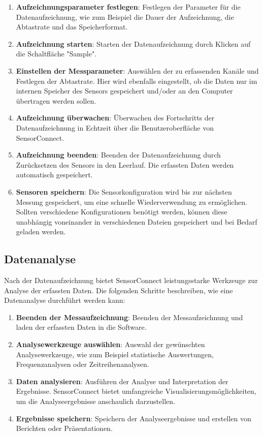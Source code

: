 \begin{enumerate}
    \item \textbf{Aufzeichnungsparameter festlegen}: Festlegen der Parameter für die Datenaufzeichnung, wie zum Beispiel die Dauer der Aufzeichnung, die Abtastrate und das Speicherformat.
    \item \textbf{Aufzeichnung starten}: Starten der Datenaufzeichnung durch Klicken auf die Schaltfläche "Sample".
    \item \textbf{Einstellen der Messparameter}: Auswählen der zu erfassenden Kanäle und Festlegen der Abtastrate. Hier wird ebenfalls eingestellt, ob die Daten nur im internen Speicher des Sensors gespeichert und/oder an den Computer übertragen werden sollen.
    \item \textbf{Aufzeichnung überwachen}: Überwachen des Fortschritts der Datenaufzeichnung in Echtzeit über die Benutzeroberfläche von SensorConnect.
    \item \textbf{Aufzeichnung beenden}: Beenden der Datenaufzeichnung durch Zurücksetzen des Sensors in den Leerlauf. Die erfassten Daten werden automatisch gespeichert.
    \item \textbf{Sensoren speichern}: Die Sensorkonfiguration wird bis zur nächsten Messung gespeichert, um eine schnelle Wiederverwendung zu ermöglichen. Sollten verschiedene Konfigurationen benötigt werden, können diese unabhängig voneinander in verschiedenen Dateien gespeichert und bei Bedarf geladen werden.
\end{enumerate}

\subsection{Datenanalyse}
Nach der Datenaufzeichnung bietet SensorConnect leistungsstarke Werkzeuge zur Analyse der erfassten Daten. Die folgenden Schritte beschreiben, wie eine Datenanalyse durchführt werden kann:

\begin{enumerate}
    \item \textbf{Beenden der Messaufzeichnung}: Beenden der Messaufzeichnung und laden der erfassten Daten in die Software.
    \item \textbf{Analysewerkzeuge auswählen}: Auswahl der gewünschten Analysewerkzeuge, wie zum Beispiel statistische Auswertungen, Frequenzanalysen oder Zeitreihenanalysen.
    \item \textbf{Daten analysieren}: Ausführen der Analyse und Interpretation der Ergebnisse. SensorConnect bietet umfangreiche Visualisierungsmöglichkeiten, um die Analyseergebnisse anschaulich darzustellen.
    \item \textbf{Ergebnisse speichern}: Speichern der Analyseergebnisse und erstellen von Berichten oder Präsentationen.
\end{enumerate}

